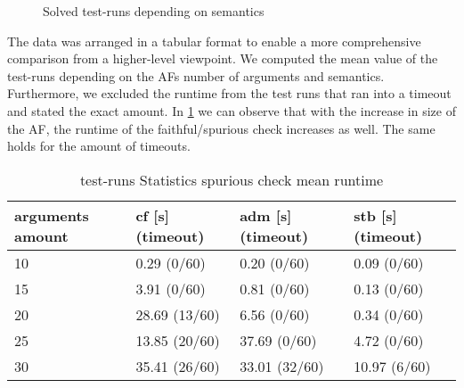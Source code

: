 \begin{figure}[H]
    \centering
    \caption{Solved test-runs depending on semantics}
    \label{fig:expfaithful/Semantics/OnePlot}
\end{figure}


The data was arranged in a tabular format to enable a more comprehensive comparison from a higher-level viewpoint. We computed the mean value of the test-runs depending on the AFs number of arguments and semantics. Furthermore, we excluded the runtime from the test runs that ran into a timeout and stated the exact amount. In \cref{table:ExperimentStatisticsFaithfulCheck} we can observe that with the increase in size of the AF, the runtime of the faithful/spurious check increases as well. The same holds for the amount of timeouts.


\begin{table}[htb]
    \centering
    \caption{test-runs Statistics spurious check mean runtime}
    \begin{tabular}{ |l|l|l|l| }
        \hline
            arguments amount & cf [s] (timeout)& adm [s] (timeout)& stb [s] (timeout)\\
        \hline
            10 &   0.29 \hfill(0/60)  &   0.20 \hfill (0/60)  &   0.09 \hfill (0/60) \\
            15 &   3.91 \hfill(0/60)  &   0.81 \hfill (0/60)  &   0.13 \hfill (0/60) \\
            20 &  28.69 \hfill(13/60) &   6.56 \hfill (0/60)  &   0.34 \hfill (0/60) \\
            25 &  13.85 \hfill(20/60) &  37.69 \hfill (0/60)  &   4.72 \hfill (0/60) \\
            30 &  35.41 \hfill(26/60) &  33.01 \hfill (32/60) &  10.97 \hfill (6/60) \\
        \hline
    \end{tabular}
\label{table:ExperimentStatisticsFaithfulCheck}
\end{table}







